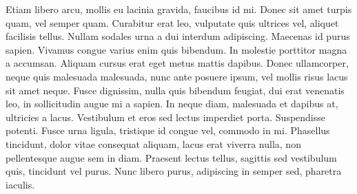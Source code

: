 Etiam libero arcu, mollis eu lacinia gravida, faucibus id mi. Donec sit amet turpis quam, vel semper quam. Curabitur erat leo, vulputate quis ultrices vel, aliquet facilisis tellus. Nullam sodales urna a dui interdum adipiscing. Maecenas id purus sapien. Vivamus congue varius enim quis bibendum. In molestie porttitor magna a accumsan. Aliquam cursus erat eget metus mattis dapibus. Donec ullamcorper, neque quis malesuada malesuada, nunc ante posuere ipsum, vel mollis risus lacus sit amet neque. Fusce dignissim, nulla quis bibendum feugiat, dui erat venenatis leo, in sollicitudin augue mi a sapien. In neque diam, malesuada et dapibus at, ultricies a lacus. Vestibulum et eros sed lectus imperdiet porta. Suspendisse potenti. Fusce urna ligula, tristique id congue vel, commodo in mi. Phasellus tincidunt, dolor vitae consequat aliquam, lacus erat viverra nulla, non pellentesque augue sem in diam. Praesent lectus tellus, sagittis sed vestibulum quis, tincidunt vel purus. Nunc libero purus, adipiscing in semper sed, pharetra iaculis.
